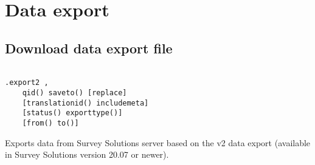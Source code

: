 
\section{Data export}
\subsection{Download data export file}
\begin{lstlisting}[style=CommandLineStyle, showlines=true]

.export2 ,
    qid() saveto() [replace]
    [translationid() includemeta]
    [status() exporttype()]
    [from() to()]

\end{lstlisting}

Exports data from Survey Solutions server based on the v2 data export (available
in Survey Solutions version 20.07 or newer).

